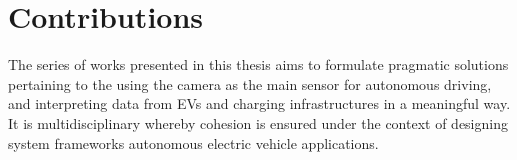 

%

\section{Contributions}
The series of works presented in this thesis aims to formulate pragmatic solutions pertaining to the using the camera as the main sensor for autonomous driving, and interpreting data from EVs and charging infrastructures in a meaningful way. It is multidisciplinary whereby cohesion is ensured under the context of designing system frameworks autonomous electric vehicle applications. 

